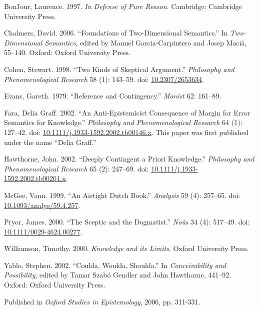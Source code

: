 \documentclass[
  11pt,
  letterpaper,
  DIV=11,
  numbers=noendperiod,
  twoside]{scrartcl}
\newlength{\cslhangindent}
\newenvironment{CSLReferences}[2] %
 {\begin{list}{}{%
  \setlength{\itemindent}{0pt}
  \setlength{\leftmargin}{0pt}
  \setlength{\parsep}{0pt}
  \ifodd #1
   \setlength{\leftmargin}{\cslhangindent}
   \setlength{\itemindent}{-1\cslhangindent}
  \fi
  \setlength{\itemsep}{#2\baselineskip}}}
 {\end{list}}
\begin{document}
\label{refs}
\begin{CSLReferences}{1}{0}
BonJour, Laurence. 1997. \emph{In Defense of Pure Reason}. Cambridge:
Cambridge University Press.

Chalmers, David. 2006. {``Foundations of Two-Dimensional Semantics.''}
In \emph{Two-Dimensional Semantics}, edited by Manuel Garcia-Carpintero
and Josep Macià, 55--140. Oxford: Oxford University Press.

Cohen, Stewart. 1998. {``Two Kinds of Skeptical Argument.''}
\emph{Philosophy and Phenomenological Research} 58 (1): 143--59. doi:
\href{https://doi.org/10.2307/2653634}{10.2307/2653634}.

Evans, Gareth. 1979. {``Reference and Contingency.''} \emph{Monist} 62:
161--89.

Fara, Delia Graff. 2002. {``An Anti-Epistemicist Consequence of Margin
for Error Semantics for Knowledge.''} \emph{Philosophy and
Phenomenological Research} 64 (1): 127--42. doi:
\href{https://doi.org/10.1111/j.1933-1592.2002.tb00146.x}{10.1111/j.1933-1592.2002.tb00146.x}.
This paper was first published under the name {``Delia Graff.''}

Hawthorne, John. 2002. {``Deeply Contingent a Priori Knowledge.''}
\emph{Philosophy and Phenomenological Research} 65 (2): 247--69. doi:
\href{https://doi.org/10.1111/j.1933-1592.2002.tb00201.x}{10.1111/j.1933-1592.2002.tb00201.x}.

McGee, Vann. 1999. {``An Airtight Dutch Book.''} \emph{Analysis} 59 (4):
257--65. doi:
\href{https://doi.org/10.1093/analys/59.4.257}{10.1093/analys/59.4.257}.

Pryor, James. 2000. {``The Sceptic and the Dogmatist.''} \emph{No{û}s}
34 (4): 517--49. doi:
\href{https://doi.org/10.1111/0029-4624.00277}{10.1111/0029-4624.00277}.

Williamson, Timothy. 2000. \emph{{Knowledge and its Limits}}. Oxford
University Press.

Yablo, Stephen. 2002. {``Coulda, Woulda, Shoulda.''} In
\emph{Conceivability and Possibility}, edited by Tamar Szabó Gendler and
John Hawthorne, 441--92. Oxford: Oxford University Press.

\end{CSLReferences}



\noindent Published in\emph{
Oxford Studies in Epistemology}, 2006, pp. 311-331.
\end{document}
